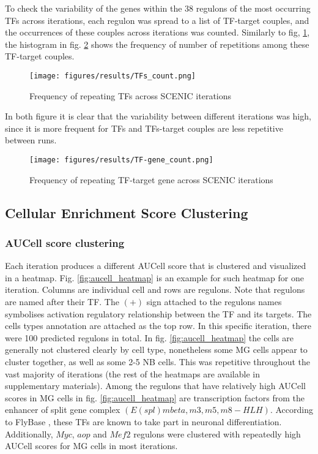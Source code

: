 To check the variability of the genes within the 38  regulons of  the most occurring TFs across iterations, 
each regulon was spread to a list of TF-target couples, and the occurrences of these couples across iterations was counted. 
Similarly to fig, \ref{fig:TFs_freq}, the histogram in fig. \ref{fig:TF-target_freq} shows the frequency of number of repetitions 
among these TF-target couples.

\begin{figure}[ht]
    \centering
    \texttt{[image: figures/results/TFs\_count.png]}
    \caption{Frequency of repeating TFs across SCENIC iterations}
    \label{fig:TFs_freq}
\end{figure}

In both figure it is clear that the variability between different iterations was high, 
since it is more frequent for TFs and TFs-target couples are less repetitive between runs. 

\begin{figure}[ht]
    \centering
    \texttt{[image: figures/results/TF-gene\_count.png]}
    \caption{Frequency of repeating TF-target gene across SCENIC iterations}
    \label{fig:TF-target_freq}
\end{figure}

\subsection{Cellular Enrichment Score Clustering }
\subsubsection{AUCell score clustering}
Each iteration produces a different AUCell score that is clustered and visualized in a heatmap. 
Fig. \ref{fig:aucell_heatmap} is an example for such heatmap for one iteration. 
Columns are individual cell and rows are regulons. Note that regulons are named after their TF.
The $(+)$ sign attached to the regulons names symbolises activation regulatory relationship between the TF and its targets. 
The cells types annotation are attached as the top row. In this specific iteration, there were 100 predicted regulons in total. 
In fig. \ref{fig:aucell_heatmap} the cells are generally not clustered clearly by cell type, 
nonetheless some MG cells appear to cluster together, as well as some 2-5 NB cells. 
This was repetitive throughout the vast majority of iterations (the rest of the heatmaps are available in supplementary materials). 
Among the regulons that have relatively high AUCell scores in MG cells in fig.
\ref{fig:aucell_heatmap} are transcription factors from the enhancer of split gene complex $(E(spl){mbeta, m3, m5, m8}-HLH)$. 
According to FlyBase \cite{thurmond2019flybase}, these TFs are known to take part in neuronal differentiation. 
Additionally, $Myc$, $aop$ and $Mef2$ regulons were clustered with repeatedly high AUCell scores for MG cells in most iterations. 


